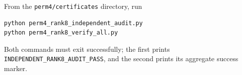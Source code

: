 From the \texttt{perm4/certificates} directory, run
\begin{verbatim}
python perm4_rank8_independent_audit.py
python perm4_rank8_verify_all.py
\end{verbatim}
Both commands must exit successfully; the first prints
\texttt{INDEPENDENT\_RANK8\_AUDIT\_PASS}, and the second prints its aggregate
success marker.
\endgroup
